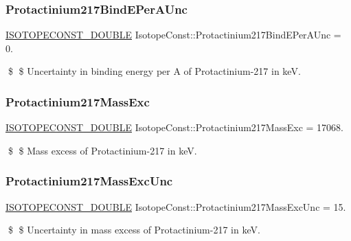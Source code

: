\subsubsection{\texorpdfstring{Protactinium217\+Bind\+E\+Per\+A\+Unc}{Protactinium217BindEPerAUnc}}
{\footnotesize\ttfamily \mbox{\hyperlink{group___isotope_const-_macros_ga8f45a7272ce02c0b4c65c44636ed719a}{I\+S\+O\+T\+O\+P\+E\+C\+O\+N\+S\+T\+\_\+\+D\+O\+U\+B\+LE}} Isotope\+Const\+::\+Protactinium217\+Bind\+E\+Per\+A\+Unc = 0.}

\$ \$ Uncertainty in binding energy per A of Protactinium-\/217 in keV. \mbox{\label{group___isotope_const-_protactinium-_pa217_ga8a22e626e0aa29706cae01dbb4b139c0}} 
\subsubsection{\texorpdfstring{Protactinium217\+Mass\+Exc}{Protactinium217MassExc}}
{\footnotesize\ttfamily \mbox{\hyperlink{group___isotope_const-_macros_ga8f45a7272ce02c0b4c65c44636ed719a}{I\+S\+O\+T\+O\+P\+E\+C\+O\+N\+S\+T\+\_\+\+D\+O\+U\+B\+LE}} Isotope\+Const\+::\+Protactinium217\+Mass\+Exc = 17068.}

\$ \$ Mass excess of Protactinium-\/217 in keV. \mbox{\label{group___isotope_const-_protactinium-_pa217_gafb07993d74d5de38c842f5164b2222ec}} 
\subsubsection{\texorpdfstring{Protactinium217\+Mass\+Exc\+Unc}{Protactinium217MassExcUnc}}
{\footnotesize\ttfamily \mbox{\hyperlink{group___isotope_const-_macros_ga8f45a7272ce02c0b4c65c44636ed719a}{I\+S\+O\+T\+O\+P\+E\+C\+O\+N\+S\+T\+\_\+\+D\+O\+U\+B\+LE}} Isotope\+Const\+::\+Protactinium217\+Mass\+Exc\+Unc = 15.}

\$ \$ Uncertainty in mass excess of Protactinium-\/217 in keV. \mbox{\label{group___isotope_const-_protactinium-_pa217_ga99fdc5d63b2468a2910f874373662b15}} 
